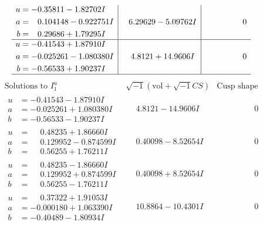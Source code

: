 \documentclass[1p]{elsarticle_modified}
\theoremstyle{definition}
\newcommand{\I}{\sqrt{-1}}
\begin{document}
$$\begin{array}{c|c|c}
\begin{aligned}
u &= -0.35811 - 1.82702 I \\
a &= \phantom{-}0.104148 - 0.922751 I \\
b &= \phantom{-}0.29686 + 1.79295 I\end{aligned}
 & \phantom{-}6.29629 - 5.09762 I & \phantom{-0.000000 } 0 \\ \hline\begin{aligned}
u &= -0.41543 + 1.87910 I \\
a &= -0.025261 - 1.080380 I \\
b &= -0.56533 + 1.90237 I\end{aligned}
 & \phantom{-}4.8121 + 14.9606 I & \phantom{-0.000000 } 0\\
 \hline 
 \end{array}$$\newpage$$\begin{array}{c|c|c}  
\text{Solutions to }I^u_{1}& \I (\text{vol} + \sqrt{-1}CS) & \text{Cusp shape}\\
 \hline 
\begin{aligned}
u &= -0.41543 - 1.87910 I \\
a &= -0.025261 + 1.080380 I \\
b &= -0.56533 - 1.90237 I\end{aligned}
 & \phantom{-}4.8121 - 14.9606 I & \phantom{-0.000000 } 0 \\ \hline\begin{aligned}
u &= \phantom{-}0.48235 + 1.86660 I \\
a &= \phantom{-}0.129952 - 0.874599 I \\
b &= \phantom{-}0.56255 + 1.76211 I\end{aligned}
 & \phantom{-}0.40098 - 8.52654 I & \phantom{-0.000000 } 0 \\ \hline\begin{aligned}
u &= \phantom{-}0.48235 - 1.86660 I \\
a &= \phantom{-}0.129952 + 0.874599 I \\
b &= \phantom{-}0.56255 - 1.76211 I\end{aligned}
 & \phantom{-}0.40098 + 8.52654 I & \phantom{-0.000000 } 0 \\ \hline\begin{aligned}
u &= \phantom{-}0.37322 + 1.91053 I \\
a &= -0.000180 + 1.063390 I \\
b &= -0.40489 - 1.80934 I\end{aligned}
 & \phantom{-}10.8864 - 10.4301 I & \phantom{-0.000000 } 0 \\ \hline\begin{aligned}

\end{aligned}
\end{array}$$
\end{document}
